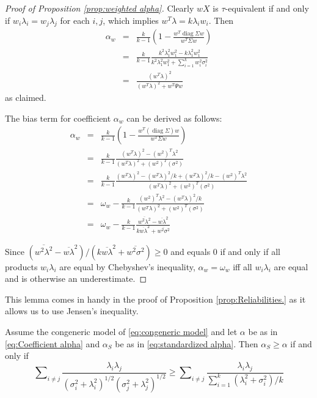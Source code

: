 \documentclass[twoside]{article}
\DeclareMathOperator{\diag}{diag}
\DeclareMathOperator{\tsum}{\textstyle \sum}
\renewcommand{\sqrt}[1]{{(#1)^{1/2}}}
\begin{document}
\begin{proof}[Proof of Proposition \ref{prop:weighted alpha}]
\label{proof:weighted alpha}Clearly $wX$ is $\tau$-equivalent
if and only if $w_{i}\lambda_{i}=w_{j}\lambda_{j}$ for each $i,j$,
which implies $w^{T}\lambda=k\lambda_{i}w_{i}$. Then
\begin{eqnarray*}
\alpha_{w} & = & \frac{k}{k-1}\left(1-\frac{w^{T}\diag\Sigma w}{w^{T}\Sigma w}\right)\\
 & = & \frac{k}{k-1}\frac{k^{2}\lambda_{1}^{2}w_{1}^{2}-k\lambda_{1}^{2}w_{1}^{2}}{k^{2}\lambda_{1}^{2}w_{1}^{2}+\tsum_{i=1}^{k}w_{i}^{2}\sigma_{i}^{2}}\\
 & = & \frac{(w^{T}\lambda)^{2}}{(w^{T}\lambda)^{2}+w^{T}\Psi w}
\end{eqnarray*}
as claimed.

The bias term for coefficient $\alpha_w$ can be derived as follows:
\begin{eqnarray*}
\alpha_{w} & = & \frac{k}{k-1}(1-\frac{w^{T}(\diag\Sigma)w}{w^{T}\Sigma w})\\
 & = & \frac{k}{k-1}\frac{(w^{T}\lambda)^{2}-(w^{2})^{T}\lambda^{2}}{(w^{T}\lambda)^{2}+(w^{2})^{T}(\sigma^{2})}\\
 & = & \frac{k}{k-1}\frac{(w^{T}\lambda)^{2}-(w^{T}\lambda)^{2}/k+(w^{T}\lambda)^{2}/k-(w^{2})^{T}\lambda^{2}}{(w^{T}\lambda)^{2}+(w^{2})^{T}(\sigma^{2})}\\
 & = & \omega_{w}-\frac{k}{k-1}\frac{(w^{2})^{T}\lambda^{2}-(w^{T}\lambda)^{2}/k}{(w^{T}\lambda)^{2}+(w^{2})^{T}(\sigma^{2})}\\
 & = & \omega_{w}-\frac{k}{k-1}\frac{\overline{w^{2}\lambda^{2}}-\overline{w\lambda}^{2}}{k\overline{w\lambda}^{2}+\overline{w^{2}\sigma^{2}}}
\end{eqnarray*}

Since $(\overline{w^{2}\lambda^{2}}-\overline{w\lambda}^{2})/(k\overline{w\lambda}^{2}+\overline{w^{2}\sigma^{2}})\geq0$
and equals $0$ if and only if all products $w_i\lambda_i$ are equal by Chebyshev's inequality, $\alpha_w=\omega_w$
iff all $w_i\lambda_i$ are equal and is otherwise an underestimate. 


\end{proof}


This lemma comes in handy in the proof of Proposition \ref{prop:Reliabilities.} as it allows us to use Jensen's inequality.

\begin{lem}
Assume the congeneric model of \eqref{eq:congeneric model} and let $\alpha$ be as in \eqref{eq:Coefficient alpha} and $\alpha_S$ be as in \eqref{eq:standardized alpha}. Then $\alpha_S\geq\alpha$
if and only if
\begin{equation}
\label{eq:alpha_s_alpha_inequality}
\tsum_{i\neq j}\frac{\lambda_{i}\lambda_{j}}{\sqrt{\sigma_{i}^{2}+\lambda_{i}^{2}}\sqrt{\sigma_j^{2}+\lambda_{j}^{2}}} 
\geq
\tsum_{i\neq j}\frac{\lambda_{i}\lambda_{j}}{\tsum_{i=1}^{k}(\lambda_{i}^{2}+\sigma_{i}^{2})/k}
\end{equation}
\end{lem}
\end{document}
